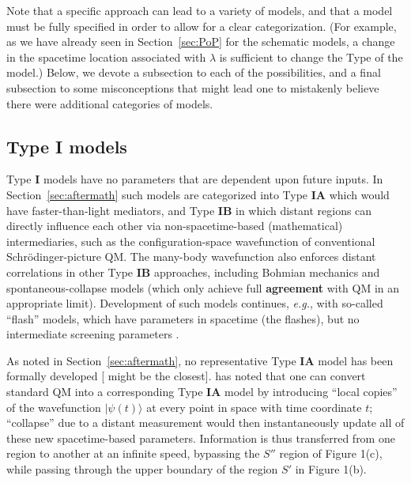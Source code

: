 \documentclass[onecolumn, nofootinbib, 12pt]{revtex4-1}
\begin{document}
Note that a specific approach can lead to a variety of models, and that a model must be fully specified in order to allow for a clear categorization.  (For example, as we have already seen in Section~\ref{sec:PoP} for the schematic models, a change in the spacetime location associated with $\lambda$ is sufficient to change the Type of the model.)  Below, we devote a subsection to each of the possibilities, and a final subsection to some misconceptions that might lead one to mistakenly believe there were additional categories of models.


\subsection{Type {\bf I} models}

Type {\bf I} models have no parameters that are dependent upon future inputs.  In Section~\ref{sec:aftermath} such models are categorized into Type {\bf IA} which would have faster-than-light mediators, and Type {\bf IB} in which distant regions can directly influence each other via non-spacetime-based (mathematical) intermediaries, such as the configuration-space wavefunction of conventional Schr\"odinger-picture QM\@.  The many-body wavefunction also enforces distant correlations in other Type {\bf IB} approaches, including Bohmian mechanics \cite{bohm1952} and spontaneous-collapse models \cite{GRW} (which only achieve full {\bf agreement} with QM in an appropriate limit).  Development of such models continues, \emph{e.g.}, with so-called ``flash''  models, which have parameters in spacetime (the flashes), but no intermediate screening parameters \cite{tumulka2006}.  

As noted in Section~\ref{sec:aftermath}, no representative Type {\bf IA} model has been formally developed [\textcite{norsen2010} might be the closest].  \textcite{spekkens2015} has noted that one can convert standard QM into a corresponding Type {\bf IA} model by introducing ``local copies'' of the wavefunction $|\psi(t)\rangle$ at every point in space with time coordinate $t$; ``collapse'' due to a distant measurement would then instantaneously update all of these new spacetime-based parameters.  Information is thus transferred from one region to another at an infinite speed, bypassing the $S''$ region of Figure 1(c), while passing through the upper boundary of the region $S'$ in Figure 1(b).
\end{document}
